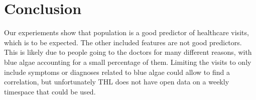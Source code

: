 \documentclass[a4paper, 12pt, english]{article}
\begin{document}
\section{Conclusion}
Our experiements show that population is
a good predictor of healthcare visits, which
is to be expected. The other included features
are not good predictors. This is likely due
to people going to the doctors for many different
reasons, with blue algae accounting for a small
percentage of them. Limiting the visits
to only include symptoms or diagnoses related to
blue algae could allow to find a correlation,
but unfortunately THL does not have open
data on a weekly timespace that could be used.
\end{document}
